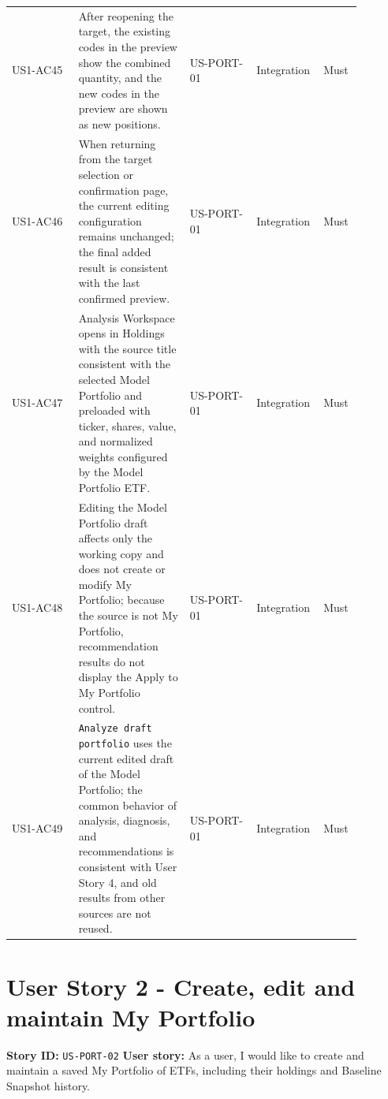 \begin{longtable}{L{0.18\linewidth}L{0.30\linewidth}L{0.18\linewidth}L{0.12\linewidth}L{0.10\linewidth}}
US1-AC45 & After reopening the target, the existing codes in the preview show the combined quantity, and the new codes in the preview are shown as new positions. & US-PORT-01 & Integration & Must \\
US1-AC46 & When returning from the target selection or confirmation page, the current editing configuration remains unchanged; the final added result is consistent with the last confirmed preview. & US-PORT-01 & Integration & Must \\
US1-AC47 & Analysis Workspace opens in Holdings with the source title consistent with the selected Model Portfolio and preloaded with ticker, shares, value, and normalized weights configured by the Model Portfolio ETF. & US-PORT-01 & Integration & Must \\
US1-AC48 & Editing the Model Portfolio draft affects only the working copy and does not create or modify My Portfolio; because the source is not My Portfolio, recommendation results do not display the Apply to My Portfolio control. & US-PORT-01 & Integration & Must \\
US1-AC49 & \texttt{Analyze draft portfolio} uses the current edited draft of the Model Portfolio; the common behavior of analysis, diagnosis, and recommendations is consistent with User Story 4, and old results from other sources are not reused. & US-PORT-01 & Integration & Must \\
\bottomrule
\end{longtable}
\endgroup
\prdhr
\hypertarget{us-port-02}{}
\section{User Story 2 - Create, edit and maintain My Portfolio}
\textbf{Story ID:} \texttt{US-PORT-02}
\textbf{User story:} As a user, I would like to create and maintain a saved My Portfolio of ETFs, including their holdings and Baseline Snapshot history.

